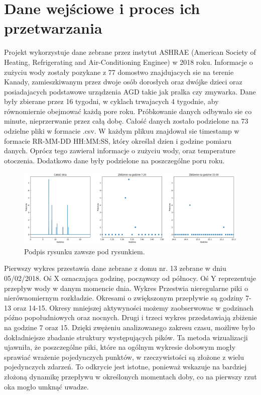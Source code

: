 \documentclass[a4paper,twoside,12pt]{book}
\begin{document}
\section{Dane wejściowe i proces ich przetwarzania}
Projekt wykorzystuje dane zebrane przez instytut ASHRAE (American Society of Heating, Refrigerating and Air-Conditioning Enginee) w 2018 roku. Informacje o zużyciu wody zostały pozykane z 77 domostwo znajdujacych sie na terenie Kanady, zamieszkiwanym przez dwoje osób dorosłych oraz dwójke dzieci oraz posiadajacych podstawowe urządzenia AGD takie jak pralka czy zmywarka. Dane były zbierane przez 16 tygodni, w cyklach trwajacych 4 tygodnie, aby równomiernie obejmować każdą pore roku. Próbkowanie danych odbywało sie co minute, nieprzerwanie przez całą dobę. Całość danych zostało podzielone na 73 odzielne pliki w formacie .csv. W każdym plikuu znajdował sie timestamp w formacie RR-MM-DD HH:MM:SS, który określał dzien i godzine pomiaru danych. Oprócz tego zawierał informacje o zużyciu wody, oraz temperature otoczenia. Dodatkowo dane były podzielone na poszczególne poru roku.
\begin{figure}[!h]
	\centering
	\includegraphics[width=1\textwidth]{img/Dane_nowe_disp.png}
	\caption{Podpis rysunku zawsze pod rysunkiem.}
	\label{fig:etykieta-rysunku}
\end{figure}
Pierwszy wykres przestawia dane zebrane z domu nr. 13 zebrane w dniu 05/02/2018. Oś X oznaczająca godzinę, począwszy od północy. Oś Y reprezentuje przepływ wody w danym momencie dnia. Wykres Przestwia nieregularne piki o nierównomiernym rozkładzie. Okresami o zwiększonym przepływie są godziny 7-13 oraz 14-15. Okresy mniejszej aktywyności możemy zaobserwowac w godzinach późno popołudniowych oraz nocnych. Drugi i trzeci wykres przedstawiają zbiżenie na godzine 7 oraz 15. Dzięki zwężeniu analizowanego zakresu czasu, możliwe było dokładniejsze zbadanie struktury występujących pików. Ta metoda wizualizacji ujawniła, że poszczególne piki, które na ogólnym wykresie dobowym mogły sprawiać wrażenie pojedynczych punktów, w rzeczywistości są złożone z wielu pojedynczych zdarzeń. To odkrycie jest istotne, ponieważ wskazuje na bardziej złożoną dynamikę przepływu w określonych momentach doby, co na pierwszy rzut oka mogło umknąć uwadze.\\
\end{document}
